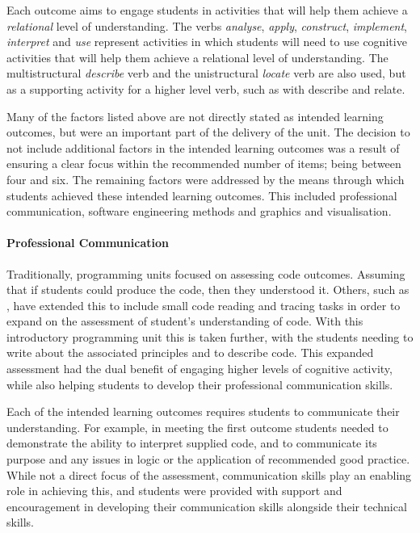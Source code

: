 Each outcome aims to engage students in activities that will help them achieve a \emph{relational} level of understanding. The verbs \emph{analyse}, \emph{apply}, \emph{construct}, \emph{implement}, \emph{interpret} and \emph{use} represent activities in which students will need to use cognitive activities that will help them achieve a relational level of understanding. The multistructural \emph{describe} verb and the unistructural \emph{locate} verb are also used, but as a supporting activity for a higher level verb, such as with describe and relate.

Many of the factors listed above are not directly stated as intended learning outcomes, but were an important part of the delivery of the unit. The decision to not include additional factors in the intended learning outcomes was a result of ensuring a clear focus within the recommended number of items; being between four and six. The remaining factors were addressed by the means through which students achieved these intended learning outcomes. This included professional communication, software engineering methods and graphics and visualisation.

\paragraph{Professional Communication} %
\label{par:professional_communication}

Traditionally, programming units focused on assessing code outcomes. Assuming that if students could produce the code, then they understood it. Others, such as \citet{Lister:2004}, have extended this to include small code reading and tracing tasks in order to expand on the assessment of student's understanding of code. With this introductory programming unit this is taken further, with the students needing to write about the associated principles and to describe code. This expanded assessment had the dual benefit of engaging higher levels of cognitive activity, while also helping students to develop their professional communication skills.

Each of the intended learning outcomes requires students to communicate their understanding. For example, in meeting the first outcome students needed to demonstrate the ability to interpret supplied code, and to communicate its purpose and any issues in logic or the application of recommended good practice. While not a direct focus of the assessment, communication skills play an enabling role in achieving this, and students were provided with support and encouragement in developing their communication skills alongside their technical skills.

